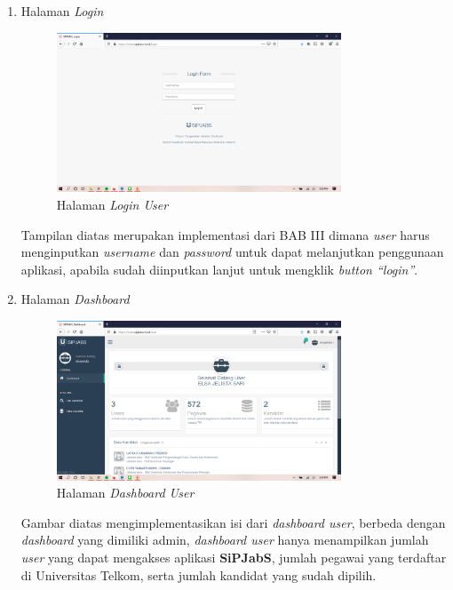 \begin{enumerate}
	
	\item Halaman \textit{Login}
	\begin{figure}
		\centering
		\includegraphics[width=0.8\textwidth]
		{pics/user/implementasi/login.png}
		\caption{Halaman \textit{Login User}}
		\label{fig:CC10}
	\end{figure}
	
	Tampilan diatas merupakan implementasi dari BAB III dimana \textit{user} harus menginputkan \textit{username} dan \textit{password} untuk dapat melanjutkan penggunaan aplikasi, apabila sudah diinputkan lanjut untuk mengklik \textit{button “login”}. 
	
	\item Halaman \textit{Dashboard}
	\begin{figure}
		\centering
		\includegraphics[width=0.8\textwidth]
		{pics/user/implementasi/dashboard.png}
		\caption{Halaman \textit{Dashboard User}}
		\label{fig:CC10}
	\end{figure}
	
	Gambar diatas mengimplementasikan isi dari \textit{dashboard user}, berbeda dengan \textit{dashboard} yang dimiliki admin, \textit{dashboard user} hanya menampilkan jumlah \textit{user} yang dapat mengakses aplikasi \textbf{SiPJabS}, jumlah pegawai yang terdaftar di Universitas Telkom, serta jumlah kandidat yang sudah dipilih. 
	

\end{enumerate}
